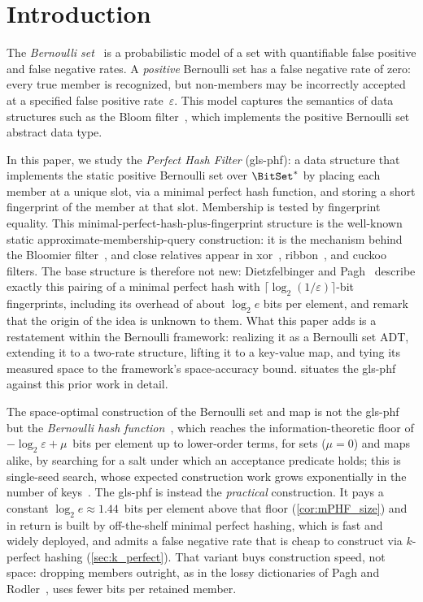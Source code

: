 \documentclass[ ../main.tex]{subfiles}
\begin{document}
\section{Introduction}

The \emph{Bernoulli set}~\cite{bsets} is a probabilistic model of a set with
quantifiable false positive and false negative rates. A \emph{positive}
Bernoulli set has a false negative rate of zero: every true member is
recognized, but non-members may be incorrectly accepted at a specified false
positive rate~$\varepsilon$. This model captures the semantics of data
structures such as the Bloom filter~\cite{bf}, which implements the positive
Bernoulli set abstract data type.

In this paper, we study the \emph{Perfect Hash Filter} (\gls{gls-phf}): a data
structure that implements the static positive Bernoulli set over $\BitSet^*$ by
placing each member at a unique slot, via a minimal perfect hash function, and
storing a short fingerprint of the member at that slot. Membership is tested by
fingerprint equality. This minimal-perfect-hash-plus-fingerprint structure is
the well-known static approximate-membership-query construction: it is the
mechanism behind the Bloomier filter~\cite{bloomier}, and close relatives appear
in xor~\cite{graf2020}, ribbon~\cite{dillinger2021}, and cuckoo~\cite{fan2014}
filters. The base structure is therefore not new: Dietzfelbinger and
Pagh~\cite[Sec.~1]{dietzfelbinger2008} describe exactly this pairing of a
minimal perfect hash with $\lceil\log_2(1/\varepsilon)\rceil$-bit fingerprints,
including its overhead of about $\log_2 e$ bits per element, and remark that
the origin of the idea is unknown to them. What this paper adds is a
restatement within the Bernoulli framework: realizing it as a Bernoulli set ADT,
extending it to a two-rate structure, lifting it to a key-value map, and tying
its measured space to the framework's space-accuracy bound. 
situates the \gls{gls-phf} against this prior work in detail.

The space-optimal construction of the Bernoulli set and map is not the
\gls{gls-phf} but the \emph{Bernoulli hash function}~\cite{shs}, which reaches
the information-theoretic floor of $-\log_2 \varepsilon + \mu$~bits per element
up to lower-order terms, for sets ($\mu = 0$) and maps alike, by searching for
a salt under which an acceptance predicate holds; this is single-seed search,
whose expected construction work grows exponentially in the number of
keys~\cite{lehmann2025seeds}. The \gls{gls-phf} is instead the
\emph{practical} construction. It pays a constant $\log_2 e \approx 1.44$~bits
per element above that floor (\cref{cor:mPHF_size}) and in return is built by
off-the-shelf minimal perfect hashing, which is fast and widely deployed, and
admits a false negative rate that is cheap to construct via $k$-perfect
hashing (\cref{sec:k_perfect}). That variant buys construction speed, not
space: dropping members outright, as in the lossy dictionaries of Pagh and
Rodler~\cite{pagh2001lossy}, uses fewer bits per retained member.
\end{document}

